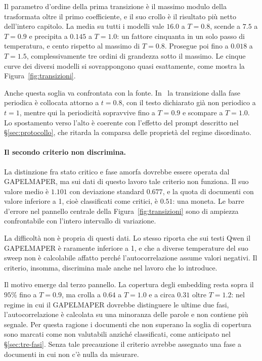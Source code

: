 Il parametro d'ordine della prima transizione è il massimo modulo della
trasformata oltre il primo coefficiente, e il suo crollo è il risultato più
netto dell'intero capitolo. La media su tutti i modelli vale $16.0$ a
$T = 0.8$, scende a $7.5$ a $T = 0.9$ e precipita a $0.145$ a $T = 1.0$: un
fattore cinquanta in un solo passo di temperatura, e cento rispetto al massimo
di $T = 0.8$. Prosegue poi fino a $0.018$ a
$T = 1.5$, complessivamente tre ordini di grandezza sotto il massimo. Le cinque
curve dei diversi modelli si sovrappongono quasi esattamente, come mostra la
Figura~\ref{fig:transizioni}.

Anche questa soglia va confrontata con la fonte.
In~\cite{mikhaylovskiy2025states} la transizione dalla fase periodica è
collocata attorno a $t = 0.8$, con il testo dichiarato già non periodico a
$t = 1$, mentre qui la periodicità sopravvive fino a $T = 0.9$ e scompare a
$T = 1.0$. Lo spostamento verso l'alto è coerente con l'effetto del prompt
descritto nel §\ref{sec:protocollo}, che ritarda la comparsa delle proprietà
del regime disordinato.

\paragraph{Il secondo criterio non discrimina.} La distinzione fra stato
critico e fase amorfa dovrebbe essere operata dal GAPELMAPER, ma sui dati di
questo lavoro tale criterio non funziona. Il suo valore medio è $1.101$ con
deviazione standard $0.677$, e la quota di documenti con valore inferiore a 1,
cioè classificati come critici, è $0.51$: una moneta. Le barre d'errore nel
pannello centrale della Figura~\ref{fig:transizioni} sono di ampiezza
confrontabile con l'intero intervallo di variazione.

La difficoltà non è propria di questi dati. Lo stesso
\cite{mikhaylovskiy2025states} riporta che sui testi Qwen il GAPELMAPER è
raramente inferiore a 1, e che a diverse temperature del suo sweep non è
calcolabile affatto perché l'autocorrelazione assume valori negativi. Il
criterio, insomma, discrimina male anche nel lavoro che lo introduce.

Il motivo emerge dal terzo pannello. La copertura degli embedding resta sopra il
$95\%$ fino a $T = 0.9$, ma crolla a $0.64$ a $T = 1.0$ e a circa $0.31$ oltre
$T = 1.2$: nel regime in cui il GAPELMAPER dovrebbe distinguere le ultime due
fasi, l'autocorrelazione è calcolata su una minoranza delle parole e non
contiene più segnale. Per questa ragione i documenti che non superano la soglia
di copertura sono marcati come non valutabili anziché classificati, come
anticipato nel §\ref{sec:tre-fasi}. Senza tale precauzione il criterio avrebbe
assegnato una fase a documenti in cui non c'è nulla da misurare.

